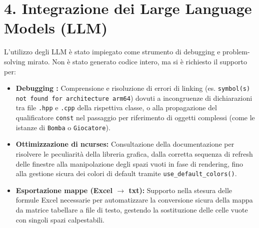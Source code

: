 \documentclass[11pt, a4paper]{article}
\begin{document}
\section*{4. Integrazione dei Large Language Models (LLM)}
L'utilizzo degli LLM è stato impiegato come strumento di debugging e problem-solving mirato. 
Non è stato generato codice intero, ma si è richiesto il supporto per:
\begin{itemize}
    \item \textbf{Debugging :} Comprensione e risoluzione di errori di linking (es. \texttt{symbol(s) not found for architecture arm64}) dovuti a 
        incongruenze di dichiarazioni tra file \texttt{.hpp} e \texttt{.cpp} della rispettiva classe, o alla propagazione del qualificatore \texttt{const} nel passaggio per riferimento di 
        oggetti complessi (come le istanze di \texttt{Bomba} o \texttt{Giocatore}).
    \item \textbf{Ottimizzazione di ncurses:} Consultazione della documentazione per risolvere le peculiarità della libreria grafica, 
        dalla corretta sequenza di refresh delle finestre alla manipolazione degli spazi vuoti in fase di rendering, fino alla gestione sicura dei colori di 
        default tramite \texttt{use\_default\_colors()}.
    \item \textbf{Esportazione mappe (Excel $\rightarrow$ txt):} Supporto nella stesura delle formule Excel necessarie per automatizzare la conversione sicura della 
        mappa da matrice tabellare a file di testo, gestendo la sostituzione delle celle vuote con singoli spazi calpestabili.
\end{itemize}
\end{document}
